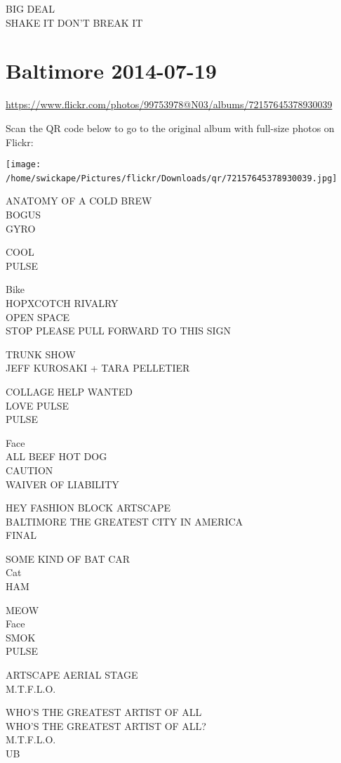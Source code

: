 \documentclass[10pt,letterpaper]{article}
\begin{document}
BIG DEAL\\
SHAKE IT DON'T BREAK IT
\

\section*{Baltimore 2014-07-19}

\url{https://www.flickr.com/photos/99753978@N03/albums/72157645378930039}

Scan the QR code below to go to the original album with full-size photos on Flickr:

\texttt{[image: /home/swickape/Pictures/flickr/Downloads/qr/72157645378930039.jpg]}
\

ANATOMY OF A COLD BREW\\
BOGUS\\
GYRO

COOL\\
PULSE

Bike\\
HOPXCOTCH RIVALRY\\
OPEN SPACE\\
STOP PLEASE PULL FORWARD TO THIS SIGN

TRUNK SHOW\\
JEFF KUROSAKI + TARA PELLETIER

COLLAGE HELP WANTED\\
LOVE PULSE\\
PULSE

Face\\
ALL BEEF HOT DOG\\
CAUTION\\
WAIVER OF LIABILITY

HEY FASHION BLOCK ARTSCAPE\\
BALTIMORE THE GREATEST CITY IN AMERICA\\
FINAL

SOME KIND OF BAT CAR\\
Cat\\
HAM

MEOW\\
Face\\
SMOK\\
PULSE

ARTSCAPE AERIAL STAGE\\
M.T.F.L.O.

WHO'S THE GREATEST ARTIST OF ALL\\
WHO'S THE GREATEST ARTIST OF ALL?\\
M.T.F.L.O.\\
UB
\end{document}
